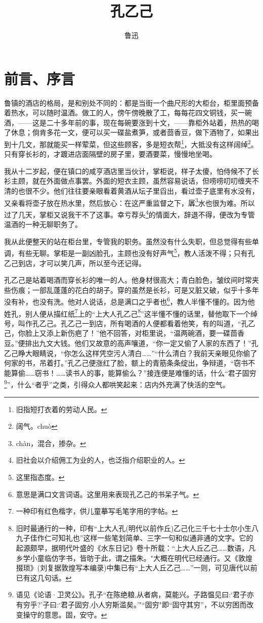 \documentclass[12pt,UTF8]{ctexbook}
\title{\heiti\zihao{0} 孔乙己}
\author{鲁迅}
\date{}
\begin{document}
\maketitle
\tableofcontents

\frontmatter
\chapter{前言、序言}

\mainmatter

鲁镇的酒店的格局，是和别处不同的：都是当街一个曲尺形的大柜台，柜里面预备着热水，可以随时温酒。做工的人，傍午傍晚散了工，每每花四文铜钱，买一碗酒，——这是二十多年前的事，现在每碗要涨到十文，——靠柜外站着，热热的喝了休息；倘肯多花一文，便可以买一碟盐煮笋，或者茴香豆，做下酒物了，如果出到十几文，那就能买一样荤菜，但这些顾客，多是短衣帮\footnote{旧指短打衣着的劳动人民。}，大抵没有这样阔绰\footnote{阔气。chuò}。只有穿长衫的，才踱进店面隔壁的房子里，要酒要菜，慢慢地坐喝。

我从十二岁起，便在镇口的咸亨酒店里当伙计，掌柜说，样子太傻，怕侍候不了长衫主顾，就在外面做点事罢。外面的短衣主顾，虽然容易说话，但唠唠叨叨缠夹不清的也很不少。他们往往要亲眼看着黄酒从坛子里舀出，看过壶子底里有水没有，又亲看将壶子放在热水里，然后放心：在这严重监督之下，羼\footnote{chàn，混合，掺杂。}水也很为难。所以过了几天，掌柜又说我干不了这事。幸亏荐头\footnote{旧社会以介绍佣工为业的人，也泛指介绍职业的人。}的情面大，辞退不得，便改为专管温酒的一种无聊职务了。

我从此便整天的站在柜台里，专管我的职务。虽然没有什么失职，但总觉得有些单调，有些无聊。掌柜是一副凶脸孔，主顾也没有好声气\footnote{这里指态度。}，教人活泼不得；只有孔乙己到店，才可以笑几声，所以至今还记得。

孔乙己是站着喝酒而穿长衫的唯一的人。他身材很高大；青白脸色，皱纹间时常夹些伤痕；一部乱蓬蓬的花白的胡子。穿的虽然是长衫，可是又脏又破，似乎十多年没有补，也没有洗。他对人说话，总是满口之乎者也\footnote{意思是满口文言词语。这里用来表现孔乙己的书呆子气。}，教人半懂不懂的。因为他姓孔，别人便从描红纸\footnote{一种印有红色楷字，供儿童摹写毛笔字用的字帖。}上的“上大人孔乙己\footnote{旧时最通行的一种，印有“上大人孔(明代以前作丘)乙己化三千七十士尔小生八九子佳作仁可知礼也”这样一些笔划简单、三字一句和似通非通的文字。它的起源颇早，据明代叶盛的《水东日记》卷十所载：“上大人丘乙己……数语，凡乡学小童临仿字书，皆昉于此，谓之描朱。"大概在明代已经通行。又《敦煌掇琐》(刘复据敦煌写本编录)中集已有“上大人丘乙己……”一则，可见唐代以前已有这几句话。}”这半懂不懂的话里，替他取下一个绰号，叫作孔乙己。孔乙己一到店，所有喝酒的人便都看着他笑，有的叫道，“孔乙己，你脸上又添上新伤疤了！”他不回答，对柜里说，“温两碗酒，要一碟茴香豆。”便排出九文大钱。他们又故意的高声嚷道，“你一定又偷了人家的东西了！”孔乙己睁大眼睛说，“你怎么这样凭空污人清白……”“什么清白？我前天亲眼见你偷了何家的书，吊着打。”孔乙己便涨红了脸，额上的青筋条条绽出，争辩道，“窃书不能算偷……窃书！……读书人的事，能算偷么？”接连便是难懂的话，什么“君子固穷\footnote{语见《论语·卫灵公》。孔子“在陈绝粮,从者病，莫能兴。子路愠见曰:‘君子亦有穷乎?'子曰:‘君子固穷,小人穷斯滥矣。'"“固穷"即“固守其穷”，不以穷困而改变操守的意思。固，安守。}”，什么“者乎”之类，引得众人都哄笑起来：店内外充满了快活的空气。
\end{document}
